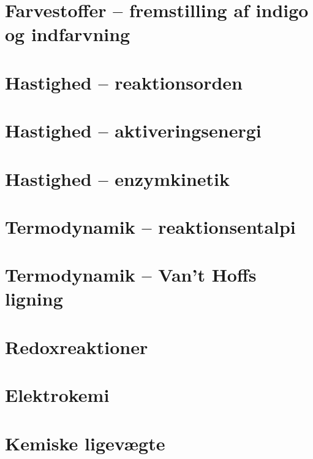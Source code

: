 \documentclass[10pt,a4paper]{article}
\theoremstyle{break}
\theoremstyle{nonumberplain}
\begin{document}
\section{Farvestoffer – fremstilling af indigo og indfarvning}

\pagebreak


\section{Hastighed – reaktionsorden}

\pagebreak


\section{Hastighed – aktiveringsenergi}

\pagebreak


\section{Hastighed – enzymkinetik}

\pagebreak


\section{Termodynamik – reaktionsentalpi}

\pagebreak


\section{Termodynamik – Van’t Hoffs ligning}

\pagebreak

\section{Redoxreaktioner}

\pagebreak


\section{Elektrokemi}

\pagebreak


\section{Kemiske ligevægte}
\end{document}

